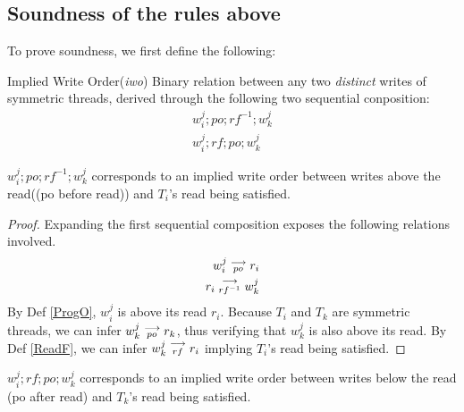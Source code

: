 \subsection{Soundness of the rules above}

    To prove soundness, we first define the following: 

    \begin{definition}{Implied Write Order(\emph{iwo})}
        \label{ImpliedW}
        Binary relation between any two \emph{distinct} writes of symmetric threads, derived through the following two sequential conposition:  
        \begin{align*}
            w_i^j;po;rf^{-1};w_k^j \\
            w_i^j;rf;po;w_k^j 
        \end{align*}
    \end{definition}


    \begin{property}
        \label{Wabv}
        $w_i^j;po;rf^{-1};w_k^j$ corresponds to an implied write order between writes above the read((po before read)) and $T_i$'s read being satisfied. 
    \end{property}
    
    \begin{proof}
        Expanding the first sequential composition exposes the following relations involved. 
        \begin{align*}
            w_i^j\stackrel{\longrightarrow}{_{po}}r_i \\ 
            r_i\stackrel{\longrightarrow}{_{rf^{-1}}}w_k^j
        \end{align*}
        By Def \ref{ProgO}, $w_i^j$ is above its read $r_i$. Because $T_i$ and $T_k$ are symmetric threads, we can infer $w_k^j\stackrel{\longrightarrow}{_{po}}r_k$, thus verifying that $w_k^j$ is also above its read. 
        By Def \ref{ReadF}, we can infer $w_k^j\stackrel{\longrightarrow}{_{rf}}r_i$ implying $T_i$'s read being satisfied.   
    \end{proof}


    \begin{property}
        \label{Wbel}
        $w_i^j;rf;po;w_k^j$ corresponds to an implied write order between writes below the read (po after read) and $T_k$'s read being satisfied.
    \end{property}

